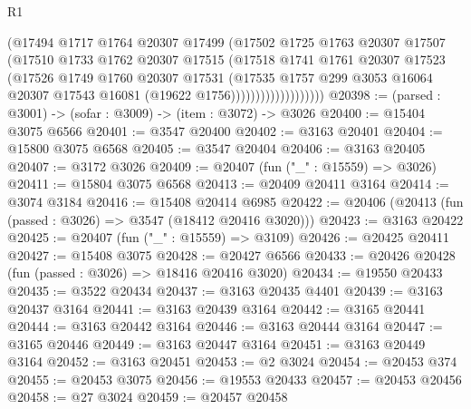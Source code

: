 \begin{lexlean}{R1}
\begin{coremodule}
                            (@17494
                              @1717
                              @1764
                              @20307
                              @17499
                              (@17502
                                @1725
                                @1763
                                @20307
                                @17507
                                (@17510
                                  @1733
                                  @1762
                                  @20307
                                  @17515
                                  (@17518
                                    @1741
                                    @1761
                                    @20307
                                    @17523
                                    (@17526
                                      @1749
                                      @1760
                                      @20307
                                      @17531
                                      (@17535
                                        @1757
                                        @299
                                        @3053
                                        @16064
                                        @20307
                                        @17543
                                        @16081
                                        (@19622 @1756)))))))))))))))))))
@20398 := (parsed : @3001) -> (sofar : @3009) -> (item : @3072) -> @3026
@20400 := @15404 @3075 @6566
@20401 := @3547 @20400
@20402 := @3163 @20401
@20404 := @15800 @3075 @6568
@20405 := @3547 @20404
@20406 := @3163 @20405
@20407 := @3172 @3026
@20409 := @20407 (fun ("_" : @15559) => @3026)
@20411 := @15804 @3075 @6568
@20413 := @20409 @20411 @3164
@20414 := @3074 @3184
@20416 := @15408 @20414 @6985
@20422 := @20406 (@20413 (fun (passed : @3026) => @3547 (@18412 @20416 @3020)))
@20423 := @3163 @20422
@20425 := @20407 (fun ("_" : @15559) => @3109)
@20426 := @20425 @20411
@20427 := @15408 @3075
@20428 := @20427 @6566
@20433 := @20426 @20428 (fun (passed : @3026) => @18416 @20416 @3020)
@20434 := @19550 @20433
@20435 := @3522 @20434
@20437 := @3163 @20435 @4401
@20439 := @3163 @20437 @3164
@20441 := @3163 @20439 @3164
@20442 := @3165 @20441
@20444 := @3163 @20442 @3164
@20446 := @3163 @20444 @3164
@20447 := @3165 @20446
@20449 := @3163 @20447 @3164
@20451 := @3163 @20449 @3164
@20452 := @3163 @20451
@20453 := @2 @3024
@20454 := @20453 @374
@20455 := @20453 @3075
@20456 := @19553 @20433
@20457 := @20453 @20456
@20458 := @27 @3024
@20459 := @20457 @20458

\end{coremodule}
\end{lexlean}
